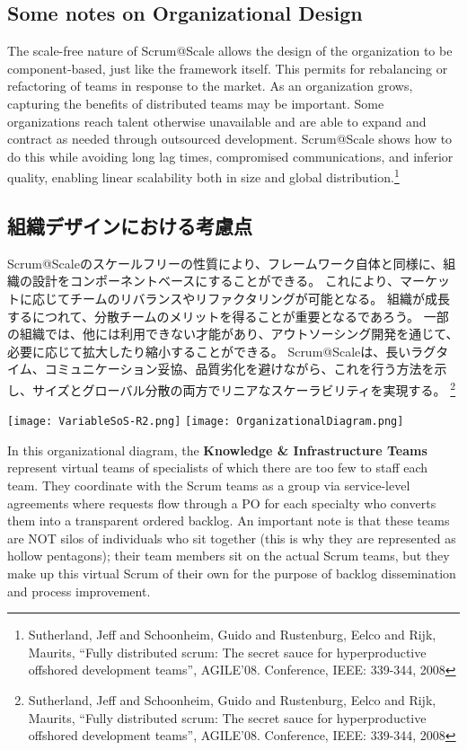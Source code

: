 \documentclass[12pt,a4paper,parskip=full]{scrartcl}
\begin{document}
\subsection{Some notes on Organizational Design}
The scale-free nature of Scrum@Scale allows the design of the organization
to be component-based, just like the framework itself. This permits for
rebalancing or refactoring of teams in response to the market. As an
organization grows, capturing the benefits of distributed teams may be
important. Some organizations reach talent otherwise unavailable and are
able to expand and contract as needed through outsourced development.
Scrum@Scale shows how to do this while avoiding long lag times, compromised
communications, and inferior quality, enabling linear scalability both in
size and global distribution.\footnote{Sutherland, Jeff and Schoonheim,
Guido and Rustenburg, Eelco and Rijk, Maurits, ``Fully distributed scrum:
The secret sauce for hyperproductive offshored development teams'',
AGILE'08. Conference, IEEE: 339-344, 2008}
\fi
\subsection{組織デザインにおける考慮点}
Scrum@Scaleのスケールフリーの性質により、フレームワーク自体と同様に、組織の設計をコンポーネントベースにすることができる。
これにより、マーケットに応じてチームのリバランスやリファクタリングが可能となる。
組織が成長するにつれて、分散チームのメリットを得ることが重要となるであろう。
一部の組織では、他には利用できない才能があり、アウトソーシング開発を通じて、必要に応じて拡大したり縮小することができる。
Scrum@Scaleは、長いラグタイム、コミュニケーション妥協、品質劣化を避けながら、これを行う方法を示し、サイズとグローバル分散の両方でリニアなスケーラビリティを実現する。
\footnote{Sutherland, Jeff and Schoonheim,
Guido and Rustenburg, Eelco and Rijk, Maurits, ``Fully distributed scrum:
The secret sauce for hyperproductive offshored development teams'',
AGILE'08. Conference, IEEE: 339-344, 2008}

\texttt{[image: VariableSoS-R2.png]}
\texttt{[image: OrganizationalDiagram.png]}

In this organizational diagram, the \textbf{Knowledge \& Infrastructure
Teams} represent virtual teams of specialists of which there are too few to
staff each team. They coordinate with the Scrum teams as a group via
service-level agreements where requests flow through a PO for each
specialty who converts them into a transparent ordered backlog. An
important note is that these teams are NOT silos of individuals who sit
together (this is why they are represented as hollow pentagons); their team
members sit on the actual Scrum teams, but they make up this virtual Scrum
of their own for the purpose of backlog dissemination and process
improvement.
\end{document}
